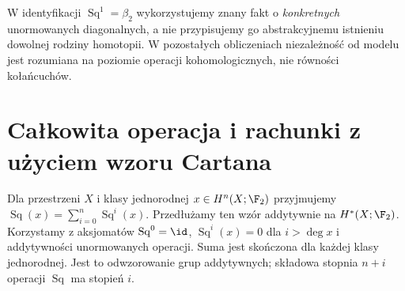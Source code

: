 \begin{uwaga}
W identyfikacji $\operatorname{Sq}^1=\beta_2$ wykorzystujemy
znany fakt o \emph{konkretnych} unormowanych diagonalnych, a nie
przypisujemy go abstrakcyjnemu istnieniu dowolnej rodziny homotopii.
W pozostałych obliczeniach niezależność od modelu jest rozumiana
na poziomie operacji kohomologicznych, nie równości kołańcuchów.
\end{uwaga}

\section{Całkowita operacja i rachunki z użyciem wzoru Cartana}
\begin{definicja}
Dla przestrzeni $X$ i klasy jednorodnej $x\in H^n(X;\F_2)$
przyjmujemy $\operatorname{Sq}(x)=\sum_{i=0}^n\operatorname{Sq}^i(x)$.
Przedłużamy ten wzór addytywnie na $H^*(X;\F_2)$.
Korzystamy z aksjomatów $\operatorname{Sq}^0=\id$,
$\operatorname{Sq}^i(x)=0$ dla $i>\deg x$ i addytywności
unormowanych operacji. Suma jest skończona dla każdej
klasy jednorodnej.
Jest to odwzorowanie grup addytywnych; składowa stopnia $n+i$
operacji $\operatorname{Sq}$ ma stopień $i$.
\end{definicja}

